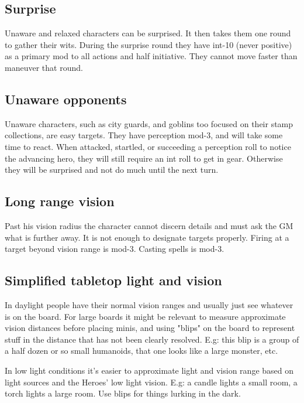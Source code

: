 \subsection*{Surprise}
Unaware and relaxed characters can be surprised. It then takes them one round to gather their wits. During the surprise round they have int-10 (never positive) as a primary mod to all actions and half initiative. They cannot move faster than maneuver that round.


\subsection*{Unaware opponents}
Unaware characters, such as city guards, and goblins too focused on their stamp collections, are easy targets. They have perception mod-3, and will take some time to react. When attacked, startled, or succeeding a perception roll to notice the advancing hero, they will still require an int roll to get in gear. Otherwise they will be surprised and not do much until the next turn.


\subsection*{Long range vision}
Past his vision radius the character cannot discern details and must ask the GM what is further away. It is not enough to designate targets properly. Firing at a target beyond vision range is mod-3. Casting spells is mod-3.


\subsection*{Simplified tabletop light and vision}
In daylight people have their normal vision ranges and usually just see whatever is on the board. For large boards it might be relevant to measure approximate vision distances before placing minis, and using "blips" on the board to represent stuff in the distance that has not been clearly resolved. E.g: this blip is a group of a half dozen or so small humanoids, that one looks like a large monster, etc.

In low light conditions it's easier to approximate light and vision range based on light sources and the Heroes' low light vision. E.g: a candle lights a small room, a torch lights a large room. Use blips for things lurking in the dark.


